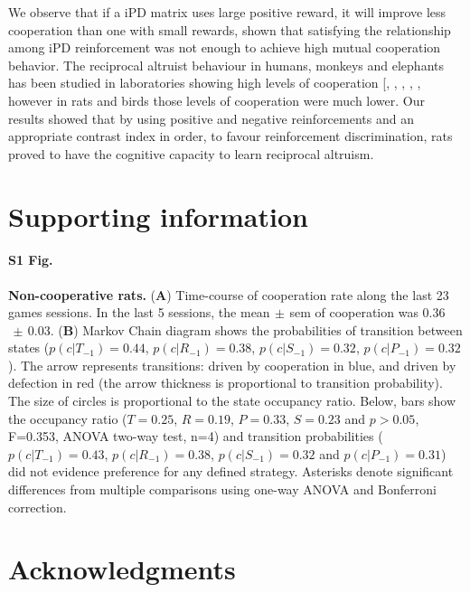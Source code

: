\documentclass[10pt,letterpaper]{article}
\begin{document}
We observe that if a iPD matrix uses large positive reward, it will improve less cooperation than one with small rewards, shown that satisfying the relationship among iPD reinforcement was not enough  to achieve high mutual cooperation behavior. 
The reciprocal altruist behaviour in humans, monkeys and elephants has been studied in laboratories showing high levels of cooperation
[\cite{wedekind1996human}, \cite{kummerli2007human}, \cite{de2000attitudinal}, \cite{hauser2003give}, \cite{Plotnik22032011}, however in rats and birds those levels of cooperation were much lower. Our results showed that by using positive and negative reinforcements and an appropriate contrast index in order, to favour reinforcement discrimination, rats proved to have the cognitive capacity to learn reciprocal altruism.

\section*{Supporting information}

\paragraph*{S1 Fig.}
\label{S1_noC}
{\bf Non-cooperative rats.} ({\bf A}) Time-course of cooperation rate along the last 23 games sessions. In the last 5 sessions, the mean$\,\pm\,$sem of cooperation was  0.36$\,\pm\,$0.03. ({\bf B}) Markov Chain diagram shows the probabilities of transition between states ($p(c|T_{-1})=0.44$, $p(c|R_{-1})=0.38$, $p(c|S_{-1})=0.32$, $p(c|P_{-1})=0.32$). The arrow represents transitions: driven by cooperation in blue, and driven by defection in red (the arrow thickness is proportional to transition probability). The size of circles is proportional to the state occupancy ratio. Below, bars show the occupancy ratio ($T=0.25$, $R=0.19$, $P=0.33$, $S=0.23$ and  $p > 0.05$,  F=0.353, ANOVA two-way test, n=4) and transition probabilities ($p(c|T_{-1})=0.43$, $p(c|R_{-1})=0.38$, $p(c|S_{-1})=0.32$ and $p(c|P_{-1})=0.31$) did not evidence preference for any defined strategy. Asterisks denote significant differences from multiple comparisons using one-way ANOVA and Bonferroni correction.

\section*{Acknowledgments}
\end{document}
